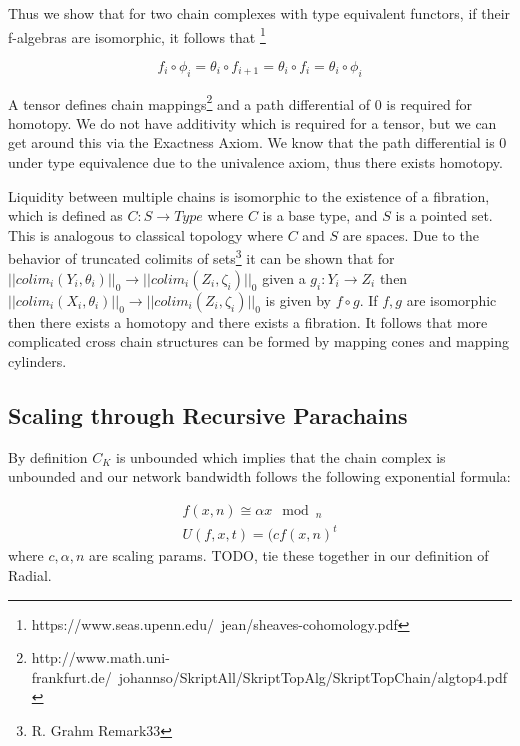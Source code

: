 \documentclass{article}
\begin{document}
Thus we show that for two chain complexes with type equivalent functors, if their f-algebras are isomorphic, it follows that \footnote{https://www.seas.upenn.edu/~jean/sheaves-cohomology.pdf}

\begin{equation}
f_i \circ \phi_i =  \theta_i \circ f_{i+1} = \theta_i \circ f_i =  \theta_i \circ \phi_i
\end{equation}

A tensor defines chain mappings\footnote{http://www.math.uni-frankfurt.de/~johannso/SkriptAll/SkriptTopAlg/SkriptTopChain/algtop4.pdf} and a path differential of 0 is required for homotopy. We do not have additivity which is required for a tensor, but we can get around this via the Exactness Axiom. We know that the path differential is 0 under type equivalence due to the univalence axiom, thus there exists homotopy.

Liquidity between multiple chains is isomorphic to the existence of a fibration, which is defined as $C: S \rightarrow Type$ where $C$ is a base type, and $S$ is a pointed set. This is analogous to classical topology where $C$ and $S$ are spaces. Due to the behavior of truncated colimits of sets\footnote{R. Grahm Remark33} it can be shown that for $ || colim_i (Y_i,\theta_i) ||_0 \rightarrow || colim_i (Z_i,\zeta_i) ||_0$ given a $g_i: Y_i  \rightarrow Z_i$ then $|| colim_i (X_i,\theta_i) ||_0 \rightarrow || colim_i (Z_i,\zeta_i) ||_0$ is given by $f \circ g$. If $f,g$ are isomorphic then there exists a homotopy and there exists a fibration. It follows that more complicated cross chain structures can be formed by mapping cones and mapping cylinders.

\subsection{Scaling through Recursive Parachains}
By definition $C_K$ is unbounded which implies that the chain complex is unbounded and our network bandwidth follows the following exponential formula:

\begin{equation} \label{eq1}
\begin{split}
f(x, n) \cong \alpha x \mod_n \\
U(f, x, t) = (c f(x, n)^t
\end{split}
\end{equation}
where $c, \alpha, n$ are scaling params. TODO, tie these together in our definition of Radial.


\end{document}
